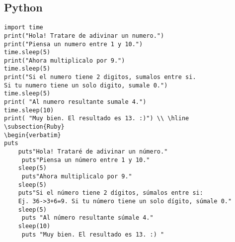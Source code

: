 \documentclass[10pt]{article}
\begin{document}
\subsection{Python}
\begin{verbatim}
import time
print("Hola! Tratare de adivinar un numero.")
print("Piensa un numero entre 1 y 10.")
time.sleep(5)	
print("Ahora multiplicalo por 9.")
time.sleep(5)
print("Si el numero tiene 2 digitos, sumalos entre si. 
Si tu numero tiene un solo digito, sumale 0.")
time.sleep(5)
print( "Al numero resultante sumale 4.")
time.sleep(10)	
print( "Muy bien. El resultado es 13. :)") \\ \hline
\subsection{Ruby}
\begin{verbatim}
puts
    puts"Hola! Trataré de adivinar un número." 
     puts"Piensa un número entre 1 y 10." 
    sleep(5)	
     puts"Ahora multiplicalo por 9." 
    sleep(5)
    puts"Si el número tiene 2 dígitos, súmalos entre si: 
    Ej. 36->3+6=9. Si tu número tiene un solo dígito, súmale 0." 
    sleep(5)
     puts "Al número resultante súmale 4." 
    sleep(10) 	
     puts "Muy bien. El resultado es 13. :) " 
\end{verbatim}     

\end{document}
